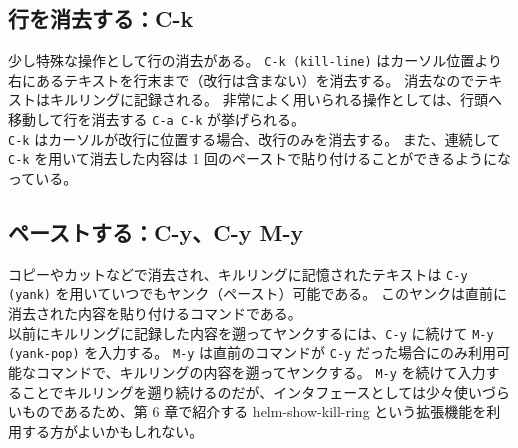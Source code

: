 \subsection{行を消去する：C-k}
少し特殊な操作として行の消去がある。
\texttt{C-k (kill-line)} はカーソル位置より右にあるテキストを行末まで（改行は含まない）を消去する。
消去なのでテキストはキルリングに記録される。
非常によく用いられる操作としては、行頭へ移動して行を消去する \texttt{C-a C-k} が挙げられる。\\

\texttt{C-k} はカーソルが改行に位置する場合、改行のみを消去する。
また、連続して \texttt{C-k} を用いて消去した内容は 1 回のペーストで貼り付けることができるようになっている。
\subsection{ペーストする：C-y、C-y M-y}
コピーやカットなどで消去され、キルリングに記憶されたテキストは \texttt{C-y (yank)} を用いていつでもヤンク（ペースト）可能である。
このヤンクは直前に消去された内容を貼り付けるコマンドである。\\

以前にキルリングに記録した内容を遡ってヤンクするには、\texttt{C-y} に続けて \texttt{M-y (yank-pop)} を入力する。
\texttt{M-y} は直前のコマンドが \texttt{C-y} だった場合にのみ利用可能なコマンドで、キルリングの内容を遡ってヤンクする。
\texttt{M-y} を続けて入力することでキルリングを遡り続けるのだが、インタフェースとしては少々使いづらいものであるため、第 6 章で紹介する helm-show-kill-ring という拡張機能を利用する方がよいかもしれない。
